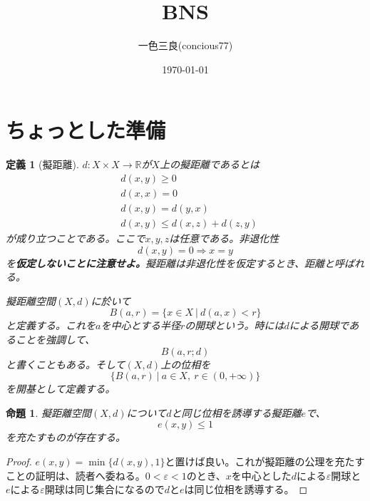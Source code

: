 \documentclass[leqno]{jsarticle}
\title{BNS}
\author{一色三良(concious77)}
\date{\today}
\newtheorem{prop}[thm]{命題}
\newtheorem{df}[thm]{定義}
\newcommand{\To}{\Longrightarrow}
\newcommand{\rr}{\mathbb{R}}
\newcommand{\mgn}{\infty}
\newcommand{\ep}{\varepsilon}
\begin{document}
\maketitle
\setcounter{section}{-1}

\section{ちょっとした準備}
\begin{df}[擬距離]
$d:X\times X\to \rr$が$X$上の擬距離であるとは
\begin{align}
&d(x,y)\ge 0\\
&d(x,x)=0\\
&d(x,y)=d(y,x)\\
&d(x,y)\le d(x,z)+d(z,y)
\end{align}
が成り立つことである。ここで$x,y,z$は任意である。非退化性
\[
d(x,y)=0\To x=y
\]
を{\bf 仮定しないことに注意せよ。}擬距離は非退化性を仮定するとき、距離と呼ばれる。
\par
擬距離空間$(X,d)$に於いて
\[
B(a,r)=\{x\in X\ |\ d(a,x)<r\}
\]
と定義する。これを$a$を中心とする半径$r$の開球という。時には$d$による開球であることを強調して、
\[
B(a,r;d)
\]
と書くこともある。そして$(X,d)$上の位相を
\[
\{B(a,r)\ |\ a\in X,\ r\in (0,+\mgn)\}
\]
を開基として定義する。
\end{df}
\setcounter{equation}{0}
\begin{prop}
擬距離空間$(X,d)$について$d$と同じ位相を誘導する擬距離$e$で、
\[
e(x,y)\le1
\]
を充たすものが存在する。
\end{prop}
\begin{proof}
$e(x,y)=\min\{d(x,y),1\}$と置けば良い。これが擬距離の公理を充たすことの証明は、読者へ委ねる。$0<\ep<1$のとき、$x$を中心とした$d$による$\ep$開球と$e$による$\ep$開球は同じ集合になるので$d$と$e$は同じ位相を誘導する。
\end{proof}
\end{document}
